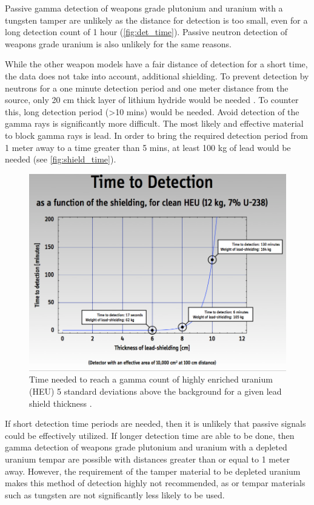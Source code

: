 \documentclass{report}
\begin{document}
Passive gamma detection of weapons grade plutonium and uranium with a tungsten tamper are unlikely as the distance for detection is too small, even for a long detection count of 1 hour (\autoref{fig:det_time}). Passive neutron detection of weapons grade uranium is also unlikely for the same reasons. 


While the other weapon models have a fair distance of detection for a short time, the data does not take into account, additional shielding. To prevent detection by neutrons for a one minute detection period and one meter distance from the source, only 20 cm thick layer of lithium hydride would be needed \cite{Fetter1990}. To counter this, long detection period (\textgreater 10 mins) \cite{Fetter1990} would be needed. Avoid detection of the gamma rays is significantly more difficult. The most likely and effective material to block gamma rays is lead. In order to bring the required detection period from 1 meter away to a time greater than 5 mins, at least 100 kg of lead would be needed (see \autoref{fig:shield_time}).


\begin{figure}[H]
 \centering
 \includegraphics[trim = 0cm 0.1cm 0cm 0cm, clip,scale=0.4]{./figures/shield_time.png}
   \caption{Time needed to reach a gamma count of highly enriched uranium (HEU) 5 standard deviations above the background for a given lead shield thickness \cite{Glaser2007}.}
     \label{fig:shield_time}
\end{figure}



If short detection time periods are needed, then it is unlikely that passive signals could be effectively utilized. If longer detection time are able to be done, then gamma detection of weapons grade plutonium and uranium with a depleted uranium tempar are possible with distances greater than or equal to 1 meter away. However, the requirement of the tamper material to be depleted uranium makes this method of detection highly not recommended, as or tempar materials such as tungsten are not significantly less likely to be used. 
\end{document}
